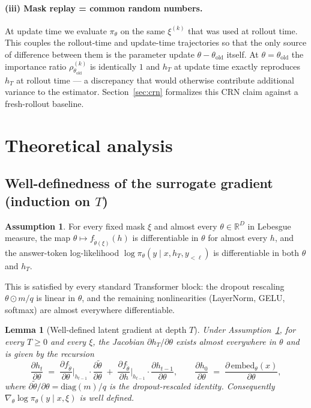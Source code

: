 \documentclass[11pt]{article}
\newtheorem{lemma}[theorem]{Lemma}
\theoremstyle{definition}
\newtheorem{assumption}[theorem]{Assumption}
\theoremstyle{remark}
\newcommand{\R}{\mathbb{R}}
\newcommand{\old}{\mathrm{old}}
\begin{document}
\paragraph{(iii) Mask replay = common random numbers.}
At update time we evaluate $\pi_\theta$ on the same $\xi^{(k)}$ that was
used at rollout time.  This couples the rollout-time and update-time
trajectories so that the only source of difference between them is the
parameter update $\theta - \theta_\old$ itself.  At $\theta = \theta_\old$
the importance ratio $\rho_{\theta_\old}^{(k)}$ is identically $1$ and
$h_T$ at update time exactly reproduces $h_T$ at rollout time --- a
discrepancy that would otherwise contribute additional variance to the
estimator.  Section~\ref{sec:crn} formalizes this CRN claim against a
fresh-rollout baseline.

\section{Theoretical analysis}
\label{sec:revision}

\subsection{Well-definedness of the surrogate gradient (induction on $T$)}

\begin{assumption}\label{ass:smooth}
For every fixed mask $\xi$ and almost every $\theta \in \R^D$ in Lebesgue
measure, the map $\theta \mapsto f_{\tilde\theta(\xi)}(h)$ is differentiable
in $\theta$ for almost every $h$, and the answer-token log-likelihood
$\log \pi_\theta(y \mid x, h_T, y_{<\ell})$ is differentiable in both
$\theta$ and $h_T$.
\end{assumption}

This is satisfied by every standard Transformer block: the dropout
rescaling $\theta \odot m/q$ is linear in $\theta$, and the remaining
nonlinearities (LayerNorm, GELU, softmax) are almost everywhere
differentiable.

\begin{lemma}[Well-defined latent gradient at depth $T$]
\label{lem:induction}
Under Assumption~\ref{ass:smooth}, for every $T \ge 0$ and every $\xi$,
the Jacobian $\partial h_T / \partial \theta$ exists almost everywhere in
$\theta$ and is given by the recursion
\begin{equation}
\frac{\partial h_t}{\partial \theta}
  \;=\;
\frac{\partial f_{\tilde\theta}}{\partial \theta}\bigg|_{h_{t-1}}
  \cdot
\frac{\partial \tilde\theta}{\partial \theta}
  \;+\;
\frac{\partial f_{\tilde\theta}}{\partial h}\bigg|_{h_{t-1}}
  \cdot
\frac{\partial h_{t-1}}{\partial \theta},
\qquad
\frac{\partial h_0}{\partial \theta}
  \;=\;
\frac{\partial \,\mathrm{embed}_\theta(x)}{\partial \theta},
\label{eq:latent-jacobian}
\end{equation}
where $\partial \tilde\theta / \partial \theta = \mathrm{diag}(m)/q$ is the
dropout-rescaled identity.  Consequently
$\nabla_\theta \log \pi_\theta(y \mid x, \xi)$ is well defined.
\end{lemma}
\end{document}
